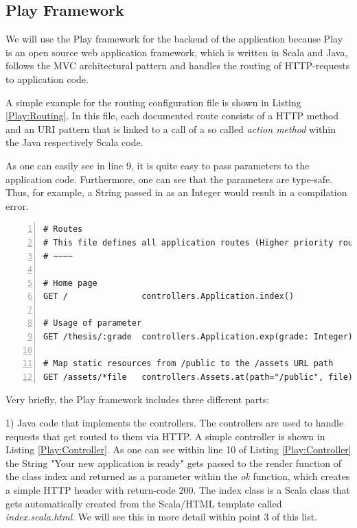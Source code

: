 \subsection{Play Framework}	
\label{Play2}
We will use the Play framework for the backend of the application because Play is an open source web application framework, which is written in Scala and Java, follows the \ac{MVC} architectural pattern and handles the routing of \ac{HTTP}-requests to application code. 

A simple example for the routing configuration file is shown in Listing \ref{Play:Routing}. In this file, each documented route consists of a \ac{HTTP} method and an \ac{URI} pattern that is linked to a call of a so called \textit{action method} within the Java respectively Scala code. 

As one can easily see in line 9, it is quite easy to pass parameters to the application code. Furthermore, one can see that the parameters are type-safe. Thus, for example, a String passed in as an Integer would result in a compilation error. 

\begin{lstlisting}[numbers=left,caption={Simple routing configuration file within the Play Framework.},label=Play:Routing,frame=tlbr,breaklines]
# Routes
# This file defines all application routes (Higher priority routes first)
# ~~~~

# Home page
GET /               controllers.Application.index()

# Usage of parameter
GET /thesis/:grade  controllers.Application.exp(grade: Integer)

# Map static resources from /public to the /assets URL path
GET /assets/*file   controllers.Assets.at(path="/public", file)
\end{lstlisting}

Very briefly, the Play framework includes three different parts: 

1) Java code that implements the controllers. The controllers are used to handle requests that get routed to them via \ac{HTTP}. A simple controller is shown in Listing \ref{Play:Controller}. As one can see within line 10 of Listing \ref{Play:Controller} the String "Your new application is ready" gets passed to the render function of the class index and returned as a parameter within the \textit{ok} function, which creates a simple \ac{HTTP} header with return-code $200$. The index class is a Scala class that gets automatically created from the Scala/\acs{HTML} template called \textit{index.scala.html}. We will see this in more detail within point 3 of this list.

